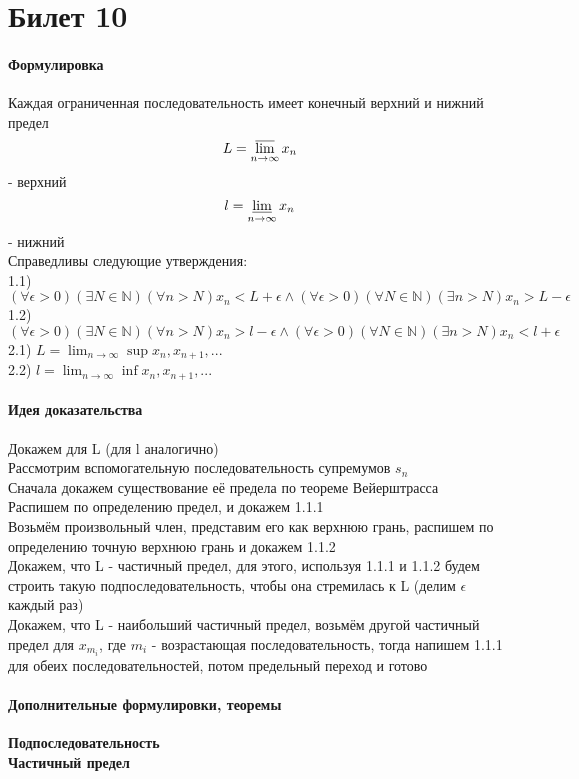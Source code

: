 \documentclass[a4paper,10pt]{article}
\begin{document}
	\section{Билет 10}
	\begin{center} 
		\item \paragraph{Формулировка} 
	\end{center}
	Каждая ограниченная последовательность имеет конечный верхний и нижний предел \\
	\[ L = \varlimsup_{n \to \infty}x_{n} \] - верхний \\
	\[ l = \varliminf_{n \to \infty}x_{n} \] - нижний \\
	Справедливы следующие утверждения: \\
	1.1) $(\forall \epsilon > 0)(\exists N \in \mathbb{N})(\forall n > N) x_{n} < L + \epsilon \land (\forall \epsilon > 0)(\forall N \in \mathbb{N})(\exists n > N) x_{n} > L - \epsilon$ \\
	1.2) $(\forall \epsilon > 0)(\exists N \in \mathbb{N})(\forall n > N) x_{n} > l - \epsilon \land (\forall \epsilon > 0)(\forall N \in \mathbb{N})(\exists n > N) x_{n} < l + \epsilon$ \\
	2.1) $L = \lim_{n \to \infty} \sup{x_{n},x_{n+1},...}$\\
	2.2) $l = \lim_{n \to \infty} \inf{x_{n},x_{n+1},...}$
	\begin{center} 
		\item \paragraph{Идея доказательства} 
	\end{center}
	Докажем для L (для l аналогично)\\
	Рассмотрим вспомогательную последовательность супремумов $s_{n}$ \\
	Сначала докажем существование её предела по теореме Вейерштрасса \\
	Распишем по определению предел, и докажем 1.1.1 \\
	Возьмём произвольный член, представим его как верхнюю грань, распишем по определению точную верхнюю грань и докажем 1.1.2 \\
	Докажем, что L - частичный предел, для этого, используя 1.1.1 и 1.1.2 будем строить такую подпоследовательность, чтобы она стремилась к L (делим $\epsilon$ каждый раз) \\
	Докажем, что L - наибольший частичный предел, возьмём другой частичный предел для $x_{m_{i}}$, где $m_{i}$ - возрастающая последовательность, тогда напишем 1.1.1 для обеих последовательностей, потом предельный переход и готово
	\begin{center} 
		\item \paragraph{Дополнительные формулировки, теоремы} 
	\end{center}
	\textbf{Подпоследовательность} \\
	\textbf{Частичный предел}
\end{document}
